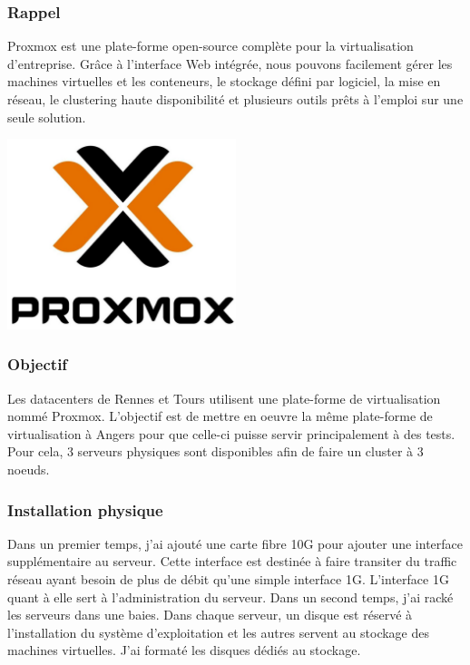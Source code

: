 \documentclass[12pt]{article}
\begin{document}
\subsubsection{Rappel}
\noindent%
\begin{minipage}{.7\textwidth}%
Proxmox est une plate-forme open-source complète pour la virtualisation d'entreprise. 
Grâce à l'interface Web intégrée, nous pouvons facilement gérer les machines virtuelles et les conteneurs, le stockage défini par logiciel, la mise en réseau, le clustering haute disponibilité et plusieurs outils prêts à l'emploi sur une seule solution.

\end{minipage}%
\hfill
\begin{minipage}{.3\textwidth}%
\begin{center}
\includegraphics[width=0.5\textwidth]{src/proxmox.JPG}
\end{center}
\end{minipage}%


\subsubsection{Objectif}
Les datacenters de Rennes et Tours utilisent une plate-forme de virtualisation nommé Proxmox. 
L'objectif est de mettre en oeuvre la même plate-forme de virtualisation à Angers pour que celle-ci puisse servir principalement à des tests. 
Pour cela, 3 serveurs physiques sont disponibles afin de faire un cluster à 3 noeuds.

\subsubsection{Installation physique}
Dans un premier temps, j'ai ajouté une carte fibre 10G pour ajouter une interface supplémentaire au serveur. 
Cette interface est destinée à faire transiter du traffic réseau ayant besoin de plus de débit qu'une simple interface 1G. 
L'interface 1G quant à elle sert à l'administration du serveur.
Dans un second temps, j'ai racké les serveurs dans une baies. 
Dans chaque serveur, un disque est réservé à l'installation du système d'exploitation et les autres servent au stockage des machines virtuelles.
J'ai formaté les disques dédiés au stockage.
\end{document}
